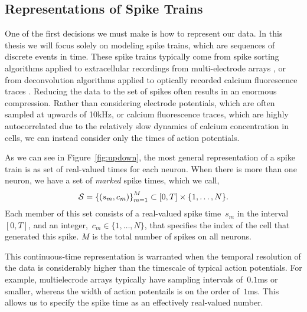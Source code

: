 \subsection{Representations of Spike Trains}
One of the first decisions we must make is how to
represent our data. In this thesis we will focus solely on modeling
spike trains, which are sequences of discrete events in time. These
spike trains typically come from spike sorting algorithms applied to
extracellular recordings from multi-electrode arrays
\cite{lewicki1998review}, or from
deconvolution algorithms applied to optically recorded calcium
fluorescence traces \cite{pnevmatikakis2016simultaneous,
  vogelstein2010fast}. Reducing the data to the set of spikes often 
results in an enormous compression. Rather than considering electrode 
potentials, which are often sampled at upwards of 10kHz, or calcium 
fluorescence traces, which are highly autocorrelated due to the relatively 
slow dynamics of calcium concentration in cells, we can instead consider 
only the times of action potentials.


As we can see in Figure~\ref{fig:updown}, the most general representation 
of a spike train is as set of real-valued times for each neuron.
When there is more than one neuron, we have a set of
\emph{marked} spike times, which we call,
\begin{align}
  \mathcal{S} = \left \{ (s_m, c_m) \right \}_{m=1}^M \subset [0, T] \times \{1, \ldots, N\}.
\end{align}
Each member of this set consists of a real-valued spike time~$s_m$ in
the interval~$[0, T]$, and an integer,~$c_m \in \{1, \ldots, N\}$,
that specifies the index of the cell that generated this spike. $M$ is 
the total number of spikes on all neurons.

This continuous-time representation is
warranted when the temporal resolution of the data is considerably
higher than the timescale of typical action potentials. For example,
multielecrode arrays typically have sampling intervals of~$0.1$ms or
smaller, whereas the width of action potentails is on the order
of~$1$ms. This allows us to specify the spike time as an effectively
real-valued number.  

